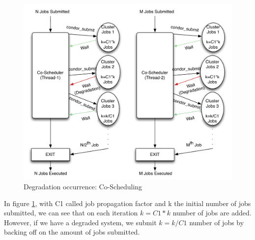 \documentclass[ms,electronic,double]{nuthesis}
\begin{document}
\begin{figure}[htbp!]
\begin{center}
\includegraphics[scale=0.75]{images/degradation_detection}
\caption{Degradation occurrence: Co-Scheduling}
\label{fig:degradationdetect-intro}
\end{center}
\end{figure}
\FloatBarrier

In figure \ref{fig:degradationdetect-intro}, with C1 called job propagation factor and k the initial number of 
jobs submitted, we can see that on each iteration $k = C1 * k$ number of jobs are added. However, if we have a degraded system, we submit $k=k/C1$ number of 
jobs by backing off on the amount of jobs submitted.
\end{document}
